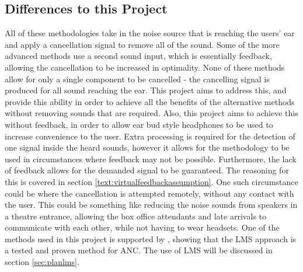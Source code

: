 \subsection{Differences to this Project}
All of these methodologies take in the noise source that is reaching the users' ear and apply a cancellation signal to remove all of the sound.
Some of the more advanced methods use a second sound input, which is essentially feedback, allowing the cancellation to be increased in optimality.
None of these methods allow for only a single component to be cancelled - the cancelling signal is produced for all sound reaching the ear.
This project aims to address this, and provide this ability in order to achieve all the benefits of the alternative methods without removing sounds that are required.
Also, this project aims to achieve this without feedback, in order to allow ear bud style headphones to be used to increase convenience to the user.
Extra processing is required for the detection of one signal inside the heard sounds, however it allows for the methodology to be used in circumstances where feedback may not be possible.
Furthermore, the lack of feedback allows for the demanded signal to be guaranteed.
The reasoning for this is covered in section \ref{text:virtualfeedbackassumption}.
One such circumstance could be where the cancellation is attempted remotely, without any contact with the user.
This could be something like reducing the noise sounds from speakers in a theatre entrance, allowing the box office attendants and late arrivals to communicate with each other, while not having to wear headsets.
One of the methods used in this project is supported by \cite{EMHeadsets,EMNoiseCancel,2SensorANCAlg}, showing that the LMS approach is a tested and proven method for ANC.
The use of LMS will be discussed in section \ref{sec:planlms}.
